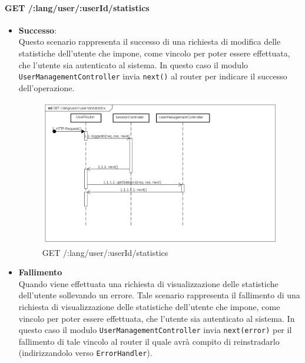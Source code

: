 \paragraph{GET /:lang/user/:userId/statistics}
\begin{itemize}
\item \textbf{Successo}:
\\
Questo scenario rappresenta il successo di una richiesta di modifica delle statistiche  dell'utente che impone, come vincolo per poter essere effettuata, che l'utente sia autenticato al sistema.  
In questo caso il modulo \texttt{UserManagementController} invia \texttt{next()} al router per indicare il successo dell'operazione.

\label{Procedura di visualizzazione delle statistiche}
\begin{figure}[ht]
	\centering
	\includegraphics[scale=0.40]{UML/DiagrammiDiSequenza/Back-end/GET_LangUserUserIdStatisticsSuccess.png}
	\caption{GET /:lang/user/:userId/statistics}
\end{figure}
\FloatBarrier
\item \textbf{Fallimento}
\\
Quando viene effettuata una richiesta di visualizzazione delle statistiche dell'utente sollevando un errore. Tale scenario rappresenta il fallimento di una richiesta di visualizzazione delle statistiche dell'utente che impone, come vincolo per poter essere effettuata, che l'utente sia autenticato al sistema. In questo caso il modulo \texttt{UserManagementController} invia \texttt{next(error)} per il fallimento di tale vincolo al router il quale avrà compito di reinstradarlo (indirizzandolo verso \texttt{ErrorHandler}).


\end{itemize}
